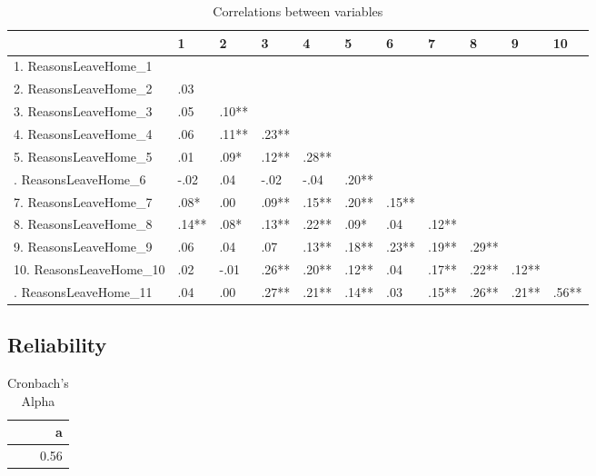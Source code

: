\documentclass[]{article}
\begin{document}
\begin{table}[H]

\caption{\label{tab:unnamed-chunk-57}Correlations between variables}
\centering
\fontsize{6}{8}\selectfont
\begin{tabular}[t]{lllllllllll}
\toprule
  & 1 & 2 & 3 & 4 & 5 & 6 & 7 & 8 & 9 & 10\\
\midrule
1. ReasonsLeaveHome\_1 &  &  &  &  &  &  &  &  &  & \\
2. ReasonsLeaveHome\_2 & .03 &  &  &  &  &  &  &  &  & \\
3. ReasonsLeaveHome\_3 & .05 & .10** &  &  &  &  &  &  &  & \\
4. ReasonsLeaveHome\_4 & .06 & .11** & .23** &  &  &  &  &  &  & \\
5. ReasonsLeaveHome\_5 & .01 & .09* & .12** & .28** &  &  &  &  &  & \\
\addlinespace
6. ReasonsLeaveHome\_6 & -.02 & .04 & -.02 & -.04 & .20** &  &  &  &  & \\
7. ReasonsLeaveHome\_7 & .08* & .00 & .09** & .15** & .20** & .15** &  &  &  & \\
8. ReasonsLeaveHome\_8 & .14** & .08* & .13** & .22** & .09* & .04 & .12** &  &  & \\
9. ReasonsLeaveHome\_9 & .06 & .04 & .07 & .13** & .18** & .23** & .19** & .29** &  & \\
10. ReasonsLeaveHome\_10 & .02 & -.01 & .26** & .20** & .12** & .04 & .17** & .22** & .12** & \\
\addlinespace
11. ReasonsLeaveHome\_11 & .04 & .00 & .27** & .21** & .14** & .03 & .15** & .26** & .21** & .56**\\
\bottomrule
\end{tabular}
\end{table}

\hypertarget{reliability-10}{%
\subsection{Reliability}\label{reliability-10}}

\begin{table}[H]

\caption{\label{tab:unnamed-chunk-58}Cronbach's Alpha}
\centering
\fontsize{6}{8}\selectfont
\begin{tabular}[t]{r}
\toprule
a\\
\midrule
0.56\\
\bottomrule
\end{tabular}
\end{table}
\end{document}
